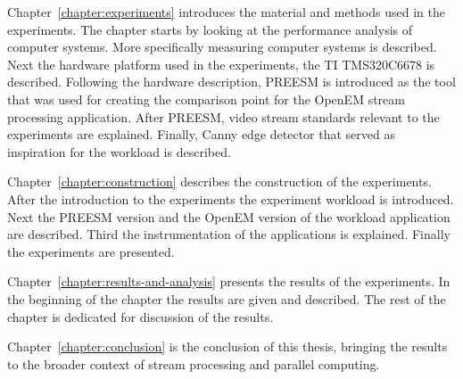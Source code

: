Chapter~\ref{chapter:experiments} introduces the material and methods used in the experiments. The chapter starts by looking at the performance analysis of computer systems. More specifically measuring computer systems is described. Next the hardware platform used in the experiments, the TI TMS320C6678 is described. Following the hardware description, PREESM is introduced as the tool that was used for creating the comparison point for the OpenEM stream processing application. After PREESM, video stream standards relevant to the experiments are explained. Finally, Canny edge detector that served as inspiration for the workload is described.

Chapter~\ref{chapter:construction} describes the construction of the experiments. After the introduction to the experiments the experiment workload is introduced. Next the PREESM version and the OpenEM version of the workload application are described. Third the instrumentation of the applications is explained. Finally the experiments are presented.

Chapter~\ref{chapter:results-and-analysis} presents the results of the experiments. In the beginning of the chapter the results are given and described. The rest of the chapter is dedicated for discussion of the results.

Chapter~\ref{chapter:conclusion} is the conclusion of this thesis, bringing the results to the broader context of stream processing and parallel computing.
